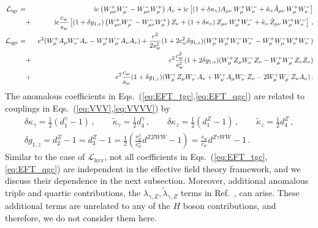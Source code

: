 \documentclass[aps,superscriptaddress,nofootinbib]{revtex4}
\begin{document}
\begin{eqnarray} 
\label{eq:EFT_tgc}
 {\cal L}_{\rm tgc}  = &  &
 \mathrm{i}  e    \left ( W_{\mu \nu}^+ W_\mu^-  -  W_{\mu \nu}^- W_\mu^+ \right ) A_\nu   
 + \mathrm{i}  e  \left [  (1 + \delta \kappa_\gamma )  A_{\mu\nu}\,W_\mu^+W_\nu^-   
+ \tilde \kappa_\gamma  \tilde A_{\mu\nu}\,W_\mu^+W_\nu^-  \right ]
\nonumber \\  &  + & \mathrm{i} e \frac{c_w}{s_w}  \left [  (1 + \delta g_{1,z})   \left ( W_{\mu \nu}^+ W_\mu^-  -  W_{\mu \nu}^- W_\mu^+ \right ) Z_\nu 
 + (1 +  \delta \kappa_z) \, Z_{\mu\nu}\,W_\mu^+W_\nu^-   
 +  \tilde  \kappa_z \,  \tilde Z_{\mu\nu}\,W_\mu^+W_\nu^-   \right ] \,,
\\
\label{eq:EFT_qgc}
 {\cal L}_{\rm qgc}  = &  &
 e^2 ( W^+_\mu A_\mu W^-_\nu A_\nu - W^+_\mu W^-_\mu A_\nu A_\nu  ) 
 + \frac{e^2}{2 s_w^2} (1+2 c_w^2 \delta g_{1,z}) ( W^+_\mu W^+_\mu W^-_\nu W^-_\nu -  W^+_\mu W^-_\mu W^+_\nu W^-_\nu )
 \nonumber \\ &+ & 
 e^2 \frac{c_w^2}{s_w^2}  (1+2\delta g_{1,z} ) ( W^+_\mu Z_\mu W^-_\nu Z_\nu -  W^+_\mu W^-_\mu Z_\nu Z_\nu )
 \nonumber \\ &+ &  
 e^2 \frac{c_w}{s_w} (1+\delta g_{1,z} ) ( W^+_\mu Z_\mu W^-_\nu A_\nu + W^+_\mu A_\mu W^-_\nu Z_\nu  - 2  W^+_\mu W^-_\mu Z_\nu A_\nu  )
 \,.
\end{eqnarray} 
The anomalous coefficients in Eqs.~(\ref{eq:EFT_tgc},\ref{eq:EFT_qgc}) are related to couplings in Eqs.~(\ref{eq:VVV},\ref{eq:VVVV}) by 
\begin{eqnarray}  
  \delta \kappa_\gamma = \frac12 \left( d_1^\gamma - 1 \right) \,,
  \quad\quad 
  \tilde \kappa_\gamma =  \frac12 d_4^\gamma \,,
  \quad\quad 
  \delta \kappa_z = \frac12 \left( d_1^Z - 1 \right) \,,
  \quad\quad 
  \tilde  \kappa_z =  \frac12 d_4^Z \,,
  \nonumber \\ 
  \delta g_{1,z} = d_2^Z - 1= d_3^Z - 1= \frac12 \left( \frac{s_w^2}{c_w^2} d^{ZZWW}-1 \right) = \frac{s_w}{c_w} d^{Z \gamma WW} -1
  \label{eq:dg1z}
  \,.
\end{eqnarray}
Similar to the case of $\mathcal{L}_\mathrm{hvv}$, not all coefficients in Eqs.~(\ref{eq:EFT_tgc},\ref{eq:EFT_qgc}) 
are independent in the effective field theory framework, and we discuss their dependence in the next subsection. 
Moreover, additional anomalous triple and quartic contributions, the $\lambda_{\gamma,Z}, \tilde \lambda_{\gamma,Z}$ 
terms in Ref.~\cite{Falkowski:2001958,deFlorian:2016spz}, can arise. 
These additional terms are unrelated to any of the $H$ boson contributions, and therefore, we do not consider them here. 
\\
\end{document}
